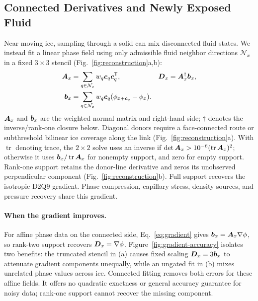 \subsection{Connected Derivatives and Newly Exposed Fluid}
\label{sec:reconstruction}
Near moving ice, sampling through a solid can mix disconnected fluid
states. We instead fit a linear phase field using only admissible fluid
neighbor directions $\mathcal N_x$ in a fixed $3\times3$ stencil
(Fig.~\ref{fig:reconstruction}a,b):
\begin{equation}
      \begin{aligned}
            \boldsymbol{A}_x & =\sum_{q\in\mathcal N_x}w_q\boldsymbol{c}_q\boldsymbol{c}_q^{\mathsf T},
                      & \boldsymbol{D}_x                                                  & =\boldsymbol{A}_x^\dagger\boldsymbol{b}_x, \\
            \boldsymbol{b}_x & =\sum_{q\in\mathcal N_x}w_q\boldsymbol{c}_q
            (\phi_{x+\boldsymbol{c}_q}-\phi_x).
      \end{aligned}
      \label{eq:gradient}
\end{equation}
$\boldsymbol{A}_x$ and $\boldsymbol{b}_x$ are the weighted normal matrix and right-hand
side; $\dagger$ denotes the inverse/rank-one closure below.
Diagonal donors require a face-connected route or subthreshold bilinear
ice coverage along the link (Fig.~\ref{fig:reconstruction}a).
With $\operatorname{tr}$ denoting trace, the $2\times2$ solve uses an inverse if
$\det\boldsymbol{A}_x>10^{-6}(\operatorname{tr}\boldsymbol{A}_x)^2$; otherwise it uses
$\boldsymbol{b}_x/\operatorname{tr}\boldsymbol{A}_x$ for nonempty support, and zero for
empty support. Rank-one support retains the donor-line derivative and
zeros its unobserved perpendicular component (Fig.~\ref{fig:reconstruction}b).
Full support recovers the isotropic D2Q9 gradient. Phase compression,
capillary stress, density sources, and pressure recovery share this gradient.

\paragraph{When the gradient improves.}
For affine phase data on the connected side, Eq.~\eqref{eq:gradient}
gives $\boldsymbol{b}_x=\boldsymbol{A}_x\nabla\phi$, so rank-two support recovers
$\boldsymbol{D}_x=\nabla\phi$. Figure~\ref{fig:gradient-accuracy} isolates two benefits:
the truncated stencil in (a) causes fixed scaling $\boldsymbol{D}_x=3\boldsymbol{b}_x$
to attenuate gradient components unequally, while an ungated fit in (b)
mixes unrelated phase values across ice. Connected fitting removes both
errors for these affine fields. It offers no quadratic exactness or general
accuracy guarantee for noisy data; rank-one support cannot recover the
missing component.

